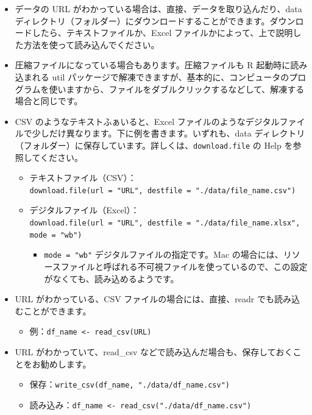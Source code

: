\documentclass[
  xelatex, ja=standard]{bxjsbook}
\providecommand{\tightlist}{%
  \setlength{\itemsep}{0pt}\setlength{\parskip}{0pt}}
\theoremstyle{definition}
\theoremstyle{definition}
\theoremstyle{definition}
\theoremstyle{definition}
\theoremstyle{remark}
\begin{document}
\begin{itemize}
\item
  データの URL がわかっている場合は、直接、データを取り込んだり、data ディレクトリ（フォルダー）にダウンロードすることができます。ダウンロードしたら、テキストファイルか、Excel ファイルかによって、上で説明した方法を使って読み込んでください。
\item
  圧縮ファイルになっている場合もあります。圧縮ファイルも R 起動時に読み込まれる util パッケージで解凍できますが、基本的に、コンピュータのプログラムを使いますから、ファイルをダブルクリックするなどして、解凍する場合と同じです。
\item
  CSV のようなテキストふぁいると、Excel ファイルのようなデジタルファイルで少しだけ異なります。下に例を書きます。いずれも、data ディレクトリ（フォルダー）に保存しています。詳しくは、\texttt{download.file} の Help を参照してください。

  \begin{itemize}
  \item
    テキストファイル（CSV）：\texttt{download.file(url\ =\ "URL",\ destfile\ =\ "./data/file\_name.csv")}
  \item
    デジタルファイル（Excel）：\texttt{download.file(url\ =\ "URL",\ destfile\ =\ "./data/file\_name.xlsx",\ mode\ =\ "wb")}

    \begin{itemize}
    \tightlist
    \item
      \texttt{mode\ =\ "wb"} デジタルファイルの指定です。Mac の場合には、リソースファイルと呼ばれる不可視ファイルを使っているので、この設定がなくても、読み込めるようです。
    \end{itemize}
  \end{itemize}
\item
  URL がわかっている、CSV ファイルの場合には、直接、readr でも読み込むことができます。

  \begin{itemize}
  \tightlist
  \item
    例：\texttt{df\_name\ \textless{}-\ read\_csv(URL)}
  \end{itemize}
\item
  URL がわかっていて、read\_csv などで読み込んだ場合も、保存しておくことをお勧めします。

  \begin{itemize}
  \item
    保存：\texttt{write\_csv(df\_name,\ "./data/df\_name.csv")}
  \item
    読み込み：\texttt{df\_name\ \textless{}-\ read\_csv("./data/df\_name.csv")}
  \end{itemize}
\end{itemize}
\end{document}
